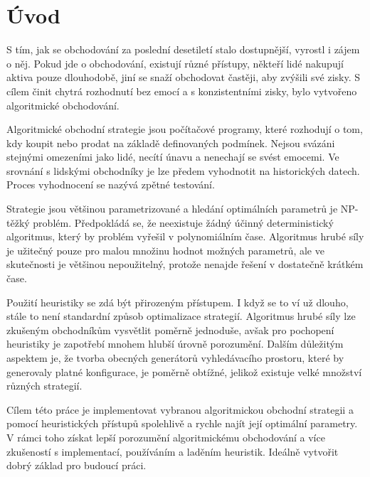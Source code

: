 \chapter*{Úvod}
\setcounter{page}{1}
S tím, jak se obchodování za poslední desetiletí stalo dostupnější, vyrostl i zájem o něj.
Pokud jde o obchodování, existují různé přístupy, někteří lidé nakupují aktiva pouze dlouhodobě, jiní se snaží obchodovat častěji, aby zvýšili své zisky.
S cílem činit chytrá rozhodnutí bez emocí a s konzistentními zisky, bylo vytvořeno algoritmické obchodování.

Algoritmické obchodní strategie jsou počítačové programy, které rozhodují o tom, kdy koupit nebo prodat na základě definovaných podmínek.
Nejsou svázáni stejnými omezeními jako lidé, necítí únavu a nenechají se svést emocemi.
Ve srovnání s lidskými obchodníky je lze předem vyhodnotit na historických datech.
Proces vyhodnocení se nazývá zpětné testování.

Strategie jsou většinou parametrizované a hledání optimálních parametrů je NP-těžký problém.
Předpokládá se, že neexistuje žádný účinný deterministický algoritmus, který by problém vyřešil v polynomiálním čase.
Algoritmus hrubé síly je užitečný pouze pro malou množinu hodnot možných parametrů, ale ve skutečnosti je většinou nepoužitelný, protože nenajde řešení v dostatečně krátkém čase.

Použití heuristiky se zdá být přirozeným přístupem.
I když se to ví už dlouho, stále to není standardní způsob optimalizace strategií.
Algoritmus hrubé síly lze zkušeným obchodníkům vysvětlit poměrně jednoduše, avšak pro pochopení heuristiky je zapotřebí mnohem hlubší úrovně porozumění.
Dalším důležitým aspektem je, že tvorba obecných generátorů vyhledávacího prostoru, které by generovaly platné konfigurace, je poměrně obtížné, jelikož existuje velké množství různých strategií.

Cílem této práce je implementovat vybranou algoritmickou obchodní strategii a pomocí heuristických přístupů spolehlivě a rychle najít její optimální parametry.
V rámci toho získat lepší porozumění algoritmickému obchodování a více zkušeností s implementací, používáním a laděním heuristik.
Ideálně vytvořit dobrý základ pro budoucí práci.

